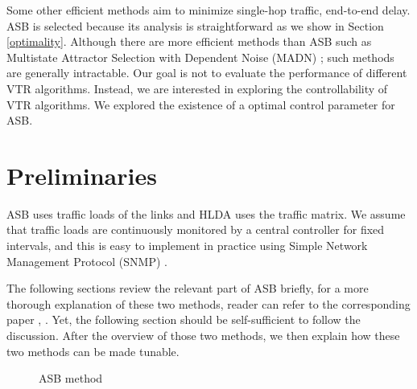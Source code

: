\documentclass[conference]{IEEEtran}
\begin{document}
Some other efficient methods aim to minimize single-hop traffic, end-to-end delay.
ASB is selected because its analysis is straightforward as we show in Section \ref{optimality}.
Although there are more efficient methods than ASB such as Multistate Attractor Selection with Dependent Noise (MADN) \cite{Hanay:VTCM13,Hanay:NTS14};
such methods are generally intractable. Our goal is not to evaluate the performance of different VTR algorithms. 
Instead, we are interested in exploring the controllability of VTR algorithms.
We explored the existence of a optimal control parameter for ASB.


 
\section{Preliminaries}\label{background}
ASB uses traffic loads of the links and HLDA uses the traffic matrix.
We assume that traffic loads are continuously monitored by a central controller for fixed intervals, 
and this is easy to implement in practice using Simple Network Management Protocol (SNMP) \cite{Wu:ASWN11}.


The following sections review the relevant part of ASB briefly, for a more thorough explanation of these two methods, reader can refer to
the corresponding paper \cite{Koizumi:10}, \cite{Ramaswami:DLTW96}. Yet, the following section should be self-sufficient to follow the discussion. 
After the overview of those two methods, 
we then explain how these two methods can be made tunable.  

\begin{figure}
   \setcounter{figure}{0}
  \renewcommand\figurename{Algorithm}

\caption{ASB method}
  \label{alg:algorithm}
\end{figure}
\end{document}
